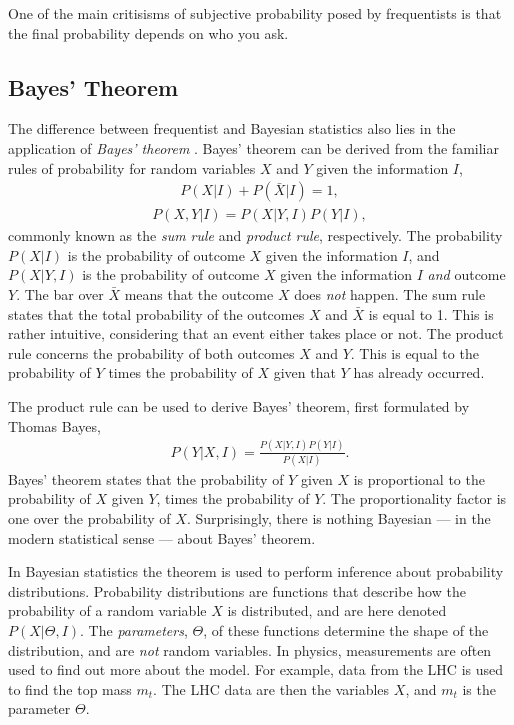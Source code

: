 \documentclass[twoside,english]{uiofysmaster}
\begin{document}
{{One of the main critisisms of subjective probability posed by frequentists is that the final probability depends on who you ask.

\subsection{Bayes' Theorem}

The difference between frequentist and Bayesian statistics also lies in the application of \textit{Bayes' theorem} \cite{mr1763essay}. Bayes' theorem can be derived from the familiar rules of probability for random variables $X$ and $Y$ given the information $I$,
\begin{align}\label{Eq:: gaussian process : Sum rule}
P(X | I) + P(\bar{X} | I) = 1,
\end{align}
\begin{align}
 \label{Eq:: gaussian process : Product rule}
P(X, Y | I) = P(X | Y, I)  P(Y | I),
\end{align} 
commonly known as the \textit{sum rule} and \textit{product rule}, respectively. The probability $P(X|I)$ is the probability of outcome $X$ given the information $I$, and $P(X|Y,I)$ is the probability of outcome $X$ given the information $I$ \textit{and} outcome $Y$. The bar over $\bar{X}$ means that the outcome $X$ does \textit{not} happen. The sum rule states that the total probability of the outcomes $X$ and $\bar{X}$ is equal to 1. This is rather intuitive, considering that an event either takes place or not. The product rule concerns the probability of both outcomes $X$ and $Y$. This is equal to the probability of $Y$ times the probability of $X$ given that $Y$ has already occurred. 

The product rule can be used to derive Bayes' theorem, first formulated by Thomas Bayes,
\begin{align}\label{Eq:: gaussian process : Bayes theorem}
P(Y | X, I) = \frac{P(X | Y, I)  P(Y | I)}{P(X | I)}.
\end{align}
Bayes' theorem states that the probability of $Y$ given $X$ is proportional to the probability of $X$ given $Y$, times the probability of $Y$. The proportionality factor is one over the probability of $X$. Surprisingly, there is nothing Bayesian --- in the modern statistical sense ---  about Bayes' theorem.  

In Bayesian statistics the theorem is used to perform inference about probability distributions. Probability distributions are functions that describe how the probability of a random variable $X$ is distributed, and are here denoted $P(X| \Theta, I)$. The \textit{parameters}, $\Theta$, of these functions determine the shape of the distribution, and are \textit{not} random variables. In physics, measurements are often used to find out more about the model. For example, data from the LHC is used to find the top mass $m_t$. The LHC data are then the variables $X$, and $m_t$ is the parameter $\Theta$. 

}}
\end{document}
